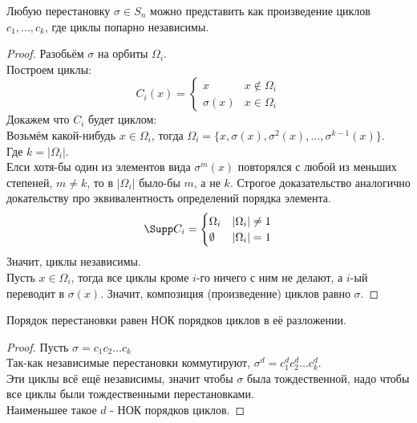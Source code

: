 \documentclass[11pt, oneside]{article}   	%
\begin{document}
    \begin{theorem}
        Любую перестановку $\sigma\in S_n$ можно представить как произведение циклов $c_1, \ldots, c_k$, где циклы попарно независимы.
        \begin{proof}
            Разобьём $\sigma$ на орбиты $\Omega_i$.\\
            Построем циклы: 
            \begin{equation*}
                C_i(x) = 
                \begin{cases}
                    x & x \not\in \Omega_i\\
                    \sigma(x) & x\in \Omega_i
                \end{cases}
            \end{equation*}
            Докажем что $C_i$ будет циклом:\\
            Возьмём какой-нибудь $x\in \Omega_i$, тогда $\Omega_i = \{x, \sigma(x), \sigma^{2}(x), \ldots, \sigma^{k-1}(x)\} $.\\
            Где $k=|\Omega_i|$.\\
            Елси хотя-бы один из элементов вида $\sigma^{m}(x)$ повторялся с любой из меньших степеней, $m\neq k$, то в $|\Omega_i|$ было-бы $m$, а не $k$. Строгое доказательство аналогично докательству про эквивалентность определений порядка элемента.\\
            \begin{equation*}
                \Supp C_i = 
                \begin{cases}
                    \Omega_i & |\Omega_i| \neq 1\\
                    \emptyset & |\Omega_i| = 1
                \end{cases}
            \end{equation*}
            Значит, циклы независимы.\\
            Пусть $x\in \Omega_i$, тогда все циклы кроме $i$-го ничего с ним не делают, а $i$-ый переводит в $\sigma(x)$. Значит, композиция (произведение) циклов равно $\sigma$.
        \end{proof}
    \end{theorem}
    \begin{theorem}
        Порядок перестановки равен НОК порядков циклов в её разложении.\\
        \begin{proof}
            Пусть $\sigma=c_1c_2\ldots c_k$\\
            Так-как независимые перестановки коммутируют, $\sigma^{d}=c_1^{d}c_2^{d}\ldots c_k^{d}$.\\
            Эти циклы всё ещё независимы, значит чтобы $\sigma$ была тождественной, надо чтобы все циклы были тождественными перестановками.\\
            Наименьшее такое $d$ - НОК порядков циклов.
        \end{proof}
    \end{theorem}
\end{document}
